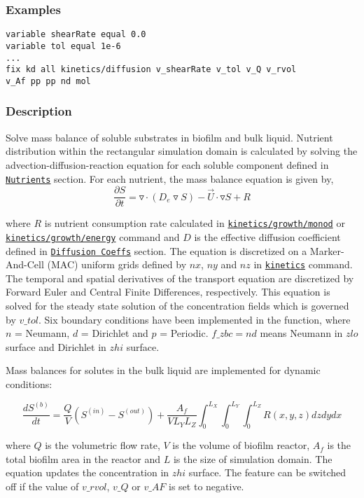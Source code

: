 \documentclass[11pt,a4paper,openright]{article}
\begin{document}
\subsubsection*{Examples}

\begin{Verbatim}[frame=single]
variable shearRate equal 0.0
variable tol equal 1e-6
...
fix kd all kinetics/diffusion v_shearRate v_tol v_Q v_rvol 
v_Af pp pp nd mol
\end{Verbatim}

\subsubsection*{Description}

Solve mass balance of soluble substrates in biofilm and bulk liquid.
Nutrient distribution within the rectangular 
simulation domain is calculated by solving the 
advection-diffusion-reaction equation for each soluble component defined in 
\hyperref[snutrients]{\tt Nutrients} section.
For each nutrient, the mass balance equation is given by, 
\[ \frac{\partial S}{\partial t} = \triangledown  \cdot (D_e \triangledown S) - \overrightarrow{U} \cdot \triangledown S + R  \] 

where $R$ is nutrient consumption rate calculated in 
\hyperref[fkineticsmonod]{\tt kinetics/growth/monod} or \hyperref[fkineticsenergy]{\tt kinetics/growth/energy} command and $D$ is the effective diffusion coefficient defined in 
\hyperref[sdiffusion]{\tt Diffusion Coeffs} section.
The equation is discretized on a Marker-And-Cell (MAC) uniform grids 
defined by $nx$, $ny$ and $nz$ in 
\hyperref[fkinetics]{\tt kinetics} command. 
The temporal and spatial derivatives of the 
transport equation are discretized by Forward Euler 
and Central Finite Differences, respectively. 
This equation is solved for the steady state solution of the concentration fields which is governed by $v\_tol$.
Six boundary conditions have been implemented in the function, 
where $n$ = Neumann, $d$ = Dirichlet and $p$ = Periodic. $f\_zbc = nd$ means Neumann in $zlo$ surface and Dirichlet in $zhi$ surface.


Mass balances for solutes in the bulk 
liquid are implemented for dynamic conditions:

\[ \frac{dS^{(b)}}{dt} = \frac{Q}{V}(S^{(in)} - S^{(out)})
+ \frac{A_f}{VL_YL_Z} \int^{L_X}_{0} \int^{L_Y}_{0} \int^{L_Z}_{0} R(x,y,z)dzdydx\] 

where $Q$ is the volumetric flow rate, $V$ is the volume of biofilm reactor, $A_f$ is 
the total biofilm area in the reactor and $L$ is the size of simulation domain. 
The equation updates the concentration in $zhi$ surface. The feature can be switched off if
the value of $v\_rvol$, $v\_Q$ or $v\_AF$ is set to negative.
\end{document}
